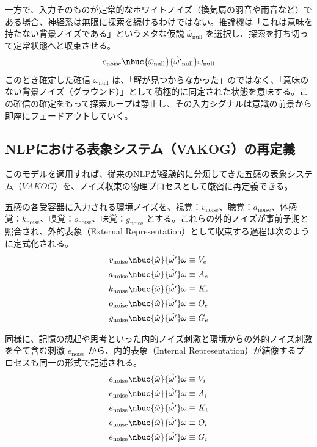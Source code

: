 一方で、入力そのものが定常的なホワイトノイズ（換気扇の羽音や雨音など）である場合、神経系は無限に探索を続けるわけではない。推論機は「これは意味を持たない背景ノイズである」というメタな仮説 $\hat{\omega}_{\mathrm{null}}$ を選択し、探索を打ち切って定常状態へと収束させる。
\begin{equation}
    e_{\mathrm{noise}} \nbuc{\hat{\omega}_{\mathrm{null}}}{\hat{\omega'}_{\mathrm{null}}} \omega_{\mathrm{null}}
\end{equation}
このとき確定した確信 $\omega_{\mathrm{null}}$ は、「解が見つからなかった」のではなく、「意味のない背景ノイズ（グラウンド）」として積極的に同定された状態を意味する。この確信の確定をもって探索ループは静止し、その入力シグナルは意識の前景から即座にフェードアウトしていく。

\subsection{NLPにおける表象システム（VAKOG）の再定義}
このモデルを適用すれば、従来のNLPが経験的に分類してきた五感の表象システム（$VAKOG$）を、ノイズ収束の物理プロセスとして厳密に再定義できる。

五感の各受容器に入力される環境ノイズを、視覚：$v_{\mathrm{noise}}$、聴覚：$a_{\mathrm{noise}}$、体感覚：$k_{\mathrm{noise}}$、嗅覚：$o_{\mathrm{noise}}$、味覚：$g_{\mathrm{noise}}$ とする。これらの外的ノイズが事前予期と照合され、外的表象（External Representation）として収束する過程は次のように定式化される。
\begin{align}
    v_{\mathrm{noise}} &\nbuc{\hat{\omega}}{\hat{\omega'}} \omega \equiv V_e \\
    a_{\mathrm{noise}} &\nbuc{\hat{\omega}}{\hat{\omega'}} \omega \equiv A_e \\
    k_{\mathrm{noise}} &\nbuc{\hat{\omega}}{\hat{\omega'}} \omega \equiv K_e \\
    o_{\mathrm{noise}} &\nbuc{\hat{\omega}}{\hat{\omega'}} \omega \equiv O_e \\
    g_{\mathrm{noise}} &\nbuc{\hat{\omega}}{\hat{\omega'}} \omega \equiv G_e
\end{align}

同様に、記憶の想起や思考といった内的ノイズ刺激と環境からの外的ノイズ刺激を全て含む刺激 $e_{\mathrm{noise}}$ から、内的表象（Internal Representation）が結像するプロセスも同一の形式で記述される。
\begin{align}
    e_{\mathrm{noise}} &\nbuc{\hat{\omega}}{\hat{\omega'}} \omega \equiv V_i \\
    e_{\mathrm{noise}} &\nbuc{\hat{\omega}}{\hat{\omega'}} \omega \equiv A_i \\
    e_{\mathrm{noise}} &\nbuc{\hat{\omega}}{\hat{\omega'}} \omega \equiv K_i \\
    e_{\mathrm{noise}} &\nbuc{\hat{\omega}}{\hat{\omega'}} \omega \equiv O_i \\
    e_{\mathrm{noise}} &\nbuc{\hat{\omega}}{\hat{\omega'}} \omega \equiv G_i
\end{align}

